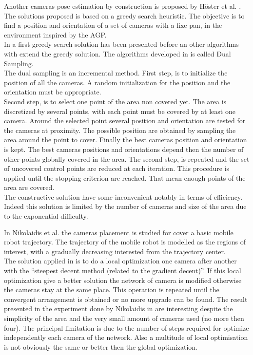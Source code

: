 Another cameras pose estimation by construction is proposed by Höster et al. \cite{171*horster2006}.
The solutions proposed is based on a greedy search heuristic. The objective is to find a position and orientation of a set of cameras with a fixe pan, in the environment inspired by the AGP. \\
In \cite{171*horster2006} a first greedy search solution has been presented before an other algorithms with extend the greedy solution. The algorithms developed in \cite{171*horster2006} is called Dual Sampling.\\
The dual sampling is an incremental method. 
First step, is to initialize the position of all the cameras. A random initialization for the position and the orientation must be appropriate.  \\
Second step, is to select one point of the area non covered yet. The area is discretized by several points, with each point must be covered by at least one camera. Around the selected point several position and orientation are tested for the cameras at proximity. The possible position are obtained by sampling the area around the point to cover. Finally the best cameras position and orientation is kept. The best cameras positions and orientations depend then the number of other points globally covered in the area. 
The second step, is repeated and the set of uncovered control points are reduced at each iteration. This procedure is applied until the stopping criterion are reached. That mean enough points of the area are covered. \\
The constructive solution have some inconvenient notably in terms of efficiency. Indeed this solution is limited by the number of cameras and size of the area due to the exponential difficulty. %

In Nikolaidis et al. \cite{81*nikolaidis2009} the cameras placement is studied for cover a basic mobile robot trajectory.
The trajectory of the mobile robot is modelled as the regions of interest, with a gradually decreasing interested from the trajectory center.\\
  The solution applied in \cite{81*nikolaidis2009} is to do a local optimization one camera after another with the “steepest decent method (related to  the gradient decent)”. If this local optimization give a better solution the network of camera is modified otherwise the cameras stay at the same place. This operation is repeated until the convergent arrangement is obtained or no more upgrade can be found. The result presented in the experiment done by Nikolaidis in  \cite{81*nikolaidis2009} are interesting despite the simplicity of the area and the very small amount of cameras used (no more then four). The principal limitation is due to the number of steps required for optimize independently each camera of the network. Also a multitude of local optimisation is not obviously the same or better then the global optimization.

